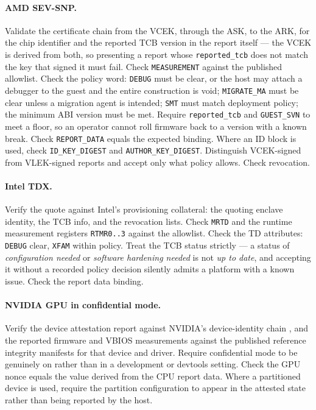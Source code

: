 \documentclass[11pt]{article}
\newcommand{\code}[1]{\texttt{#1}}
\begin{document}
\paragraph{AMD SEV-SNP.}
Validate the certificate chain from the VCEK, through the ASK, to the ARK, for the chip identifier
and the reported TCB version in the report itself --- the VCEK is derived from both, so presenting a
report whose \code{reported\_tcb} does not match the key that signed it must fail. Check
\code{MEASUREMENT} against the published allowlist. Check the policy word: \code{DEBUG} must be
clear, or the host may attach a debugger to the guest and the entire construction is void;
\code{MIGRATE\_MA} must be clear unless a migration agent is intended; \code{SMT} must match
deployment policy; the minimum ABI version must be met. Require \code{reported\_tcb} and
\code{GUEST\_SVN} to meet a floor, so an operator cannot roll firmware back to a version with a
known break. Check \code{REPORT\_DATA} equals the expected binding. Where an ID block is used, check
\code{ID\_KEY\_DIGEST} and \code{AUTHOR\_KEY\_DIGEST}. Distinguish VCEK-signed from VLEK-signed
reports and accept only what policy allows. Check revocation.

\paragraph{Intel TDX.}
Verify the quote against Intel's provisioning collateral: the quoting enclave identity, the TCB
info, and the revocation lists. Check \code{MRTD} and the runtime measurement registers
\code{RTMR0..3} against the allowlist. Check the TD attributes: \code{DEBUG} clear, \code{XFAM}
within policy. Treat the TCB status strictly --- a status of \emph{configuration needed} or
\emph{software hardening needed} is not \emph{up to date}, and accepting it without a recorded
policy decision silently admits a platform with a known issue. Check the report data binding.

\paragraph{NVIDIA GPU in confidential mode.}
Verify the device attestation report against NVIDIA's device-identity chain \cite{nvcc}, and the reported
firmware and VBIOS measurements against the published reference integrity manifests for that
device and driver. Require confidential mode to be genuinely on rather than in a development or
devtools setting. Check the GPU nonce equals the value derived from the CPU report data. Where a
partitioned device is used, require the partition configuration to appear in the attested state
rather than being reported by the host.
\end{document}
